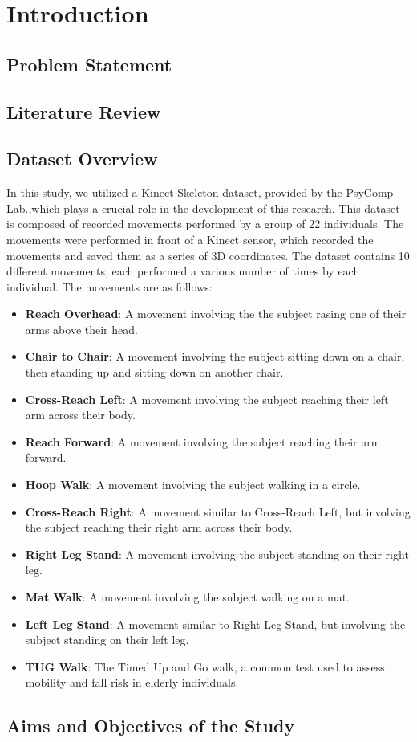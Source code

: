%
%
\chapter{Introduction}
   \section{Problem Statement}

   

   \section{Literature Review}
   
   \section{Dataset Overview}
   In this study, we utilized a Kinect Skeleton dataset, provided by the PsyComp Lab.,which plays a crucial role in the development of this research. This dataset is composed of recorded movements performed by a group of 22 individuals. The movements were performed in front of a Kinect sensor, which recorded the movements and saved them as a series of 3D coordinates. The dataset contains 10 different movements, each performed a various number of times by each individual. The movements are as follows:
   \begin{itemize}
      \item \textbf{Reach Overhead}: A movement involving the the subject rasing one of their arms above their head.
      \item \textbf{Chair to Chair}: A movement involving the subject sitting down on a chair, then standing up and sitting down on another chair.
      \item \textbf{Cross-Reach Left}: A movement involving the subject reaching their left arm across their body.
      \item \textbf{Reach Forward}: A movement involving the subject reaching their arm forward.
      \item \textbf{Hoop Walk}: A movement involving the subject walking in a circle.
      \item \textbf{Cross-Reach Right}: A movement similar to Cross-Reach Left, but involving the subject reaching their right arm across their body.
      \item \textbf{Right Leg Stand}: A movement involving the subject standing on their right leg.
      \item \textbf{Mat Walk}: A movement involving the subject walking on a mat.
      \item \textbf{Left Leg Stand}: A movement similar to Right Leg Stand, but involving the subject standing on their left leg.
      \item \textbf{TUG Walk}: The Timed Up and Go walk, a common test used to assess mobility and fall risk in elderly individuals.
   \end{itemize}

   \section{Aims and Objectives of the Study} 

\cleardoublepage